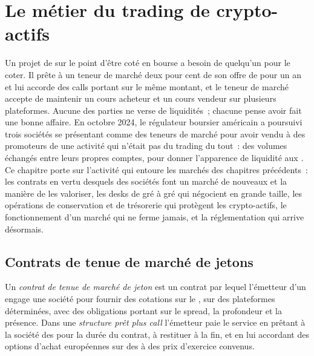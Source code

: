 \chapter{Le métier du trading de crypto-actifs}\label{ch:m3:the-crypto-trading-business}

Un projet de  sur le point d'être coté en bourse a besoin de quelqu'un pour le coter. Il prête à un teneur de marché deux pour cent
de son offre de  pour un an et lui accorde des calls portant sur le même montant, et le teneur de marché accepte
de maintenir un cours acheteur et un cours vendeur sur plusieurs plateformes. Aucune des parties ne verse de liquidités~; chacune pense avoir fait une bonne affaire. En
octobre 2024, le régulateur boursier américain a poursuivi trois sociétés se présentant comme des teneurs de
marché pour avoir vendu à des promoteurs de  une activité qui n'était pas du trading du tout~: des volumes échangés entre leurs
propres comptes, pour donner l'apparence de liquidité aux . Ce chapitre porte sur l'activité qui entoure les marchés des
chapitres précédents~: les contrats en vertu desquels des sociétés font un marché de nouveaux  et la manière de les valoriser,
les desks de gré à gré qui négocient en grande taille, les opérations de conservation et de trésorerie qui protègent les crypto-actifs,
le fonctionnement d'un marché qui ne ferme jamais, et la réglementation qui arrive désormais.

\section{Contrats de tenue de marché de jetons}

\begin{definition}\label{def:m3:the-crypto-trading-business:tmma}
Un \emph{contrat de tenue de marché de jeton} est un contrat par lequel l'émetteur d'un  engage
une société pour fournir des cotations sur le , sur des plateformes déterminées, avec des obligations portant sur le spread, la profondeur et la présence. Dans une
\emph{structure prêt plus call} l'émetteur paie le service en prêtant à la société des 
pour la durée du contrat, à restituer à la fin, et en lui accordant des options d'achat européennes sur des  à des prix d'exercice convenus.
\end{definition}


